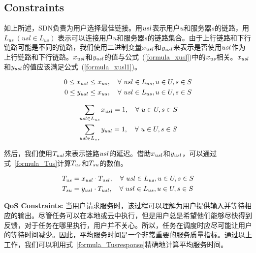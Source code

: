 \subsection{Constraints}

如上所述，SDN负责为用户选择最佳链接。用$usl$表示用户$u$和服务器$s$的链路，用$L_{us}\ (usl \in L_{us})$ 表示可以连接用户$u$和服务器$s$的链路集合。由于上行链路和下行链路可能是不同的链路，我们使用二进制变量$x_{usl}$和$y_{usl}$来表示是否使用$usl$作为上行链路和下行链路。$x_{usl}$和$y_{usl}$的值与公式~(\ref{formula_xusl})中的${x}_{us}$相关。$x_{usl}$和$y_{usl}$的值应该满足公式~(\ref{formula_xusl1})。

\begin{equation}
\label{formula_xusl}
\begin{aligned}
0 \leq x_{usl} \leq {x}_{us}, \quad \forall \ usl\in L_{us}, u\in U, s\in S\\
0 \leq y_{usl} \leq {x}_{us}, \quad \forall \ usl\in L_{us}, u\in U, s\in S\\
\end{aligned}
\end{equation}

\begin{equation}
\label{formula_xusl1}
\begin{aligned}
&\sum_{usl\in L_{us}}x_{usl} = 1, \quad \forall \ u\in U, s\in S\\
&\sum_{usl\in L_{us}}y_{usl} = 1, \quad \forall \ u\in U, s\in S\\
\end{aligned}
\end{equation}

然后，我们使用$T_{usl}$来表示链路$usl$的延迟。借助$x_{usl}$和$y_{usl}$，可以通过式~\eqref{formula_Tus}计算${T}_{us}$和${T}_{su}$的数值。

\begin{equation}
\label{formula_Tus}
\begin{aligned}
&{T}_{us} = x_{usl} \cdot T_{usl}, \quad \forall \ usl\in L_{us}, u\in U, s\in S\\
&{T}_{su} = y_{usl} \cdot T_{usl}, \quad \forall \ usl\in L_{us}, u\in U, s\in S\\
\end{aligned}
\end{equation}

\textbf{QoS Constraints:}
当用户请求服务时，该过程可以理解为用户提供输入并等待相应的输出。尽管任务可以在本地或云中执行，但是用户总是希望他们能够尽快得到反馈，对于任务在哪里执行，用户并不关心。所以，任务在调度时应尽可能让用户的等待时间减少。因此，平均服务时间是一个非常重要的服务质量指标。通过以上工作，我们可以利用式~\ref{formula_Tusresponse}精确地计算平均服务时间。

